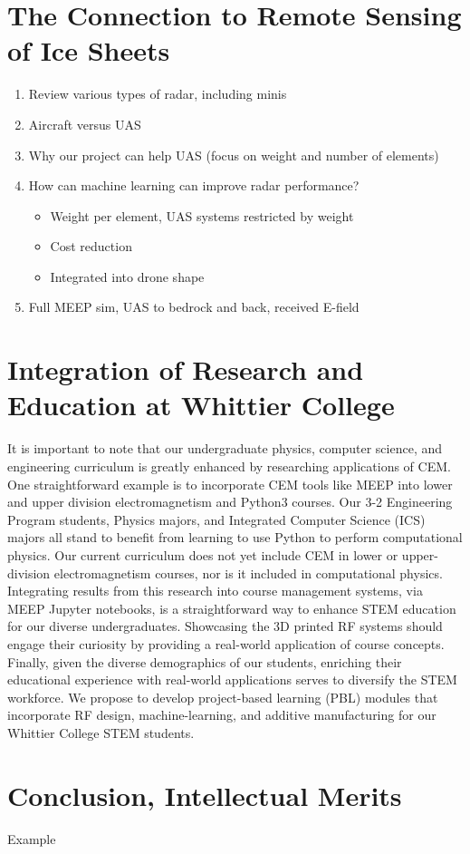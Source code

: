 \documentclass[../../main.tex]{subfiles}
\begin{document}
\section{The Connection to Remote Sensing of Ice Sheets}
\label{sec:cresis}

\begin{enumerate}
\item Review various types of radar, including minis
\item Aircraft versus UAS
\item Why our project can help UAS (focus on weight and number of elements)
\item How can machine learning can improve radar performance?
\begin{itemize}
\item Weight per element, UAS systems restricted by weight
\item Cost reduction
\item Integrated into drone shape
\end{itemize}
\item Full MEEP sim, UAS to bedrock and back, received E-field
\end{enumerate}

\section{Integration of Research and Education at Whittier College}
\label{sec:int}

It is important to note that our undergraduate physics, computer science, and engineering curriculum is greatly enhanced by researching applications of CEM.  One straightforward example is to incorporate CEM tools like MEEP into lower and upper division electromagnetism and Python3 courses.  Our 3-2 Engineering Program students, Physics majors, and Integrated Computer Science (ICS) majors all stand to benefit from learning to use Python to perform computational physics.  Our current curriculum does not yet include CEM in lower or upper-division electromagnetism courses, nor is it included in computational physics.  Integrating results from this research into course management systems, via MEEP Jupyter notebooks, is a straightforward way to enhance STEM education for our diverse undergraduates.  Showcasing the 3D printed RF systems should engage their curiosity by providing a real-world application of course concepts.  Finally, given the diverse demographics of our students, enriching their educational experience with real-world applications serves to diversify the STEM workforce.  We propose to develop project-based learning (PBL) modules that incorporate RF design, machine-learning, and additive manufacturing for our Whittier College STEM students.  \\ \vspace{2.5mm}

\section{Conclusion, Intellectual Merits}
\label{sec:conc_im}

Example
\end{document}
